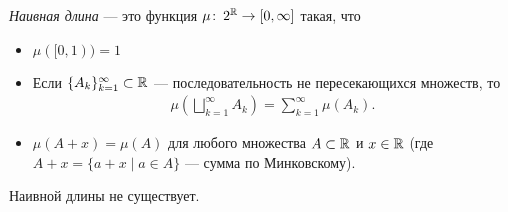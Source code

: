 \documentclass[../measure-theory.tex]{subfiles}
\begin{document}
\begin{df}
 \textit{Наивная длина} --- это функция $ \mu \colon\, 2^\mathbb{R} \to [0,\infty] $ такая, что
 \begin{itemize}
  \item $ \mu ([0, 1)) = 1 $
  \item Если $\{A_{k}\}_{k=1}^{\infty} \subset \mathbb{R} $  --- последовательность не пересекающихся множеств, то
   \begin{align*}
    \mu \left( \bigsqcup_{k=1}^{\infty} A_k \right) = \sum_{k=1}^{\infty} \mu(A_k)
   .\end{align*} 
  \item $ \mu(A + x) = \mu(A) $ для любого множества $ A \subset \mathbb{R} $ и $ x \in \mathbb{R} $ (где $ A + x = \{ a + x \mid a \in A \} $ --- сумма по Минковскому).
 \end{itemize}
\end{df}
\begin{thm}
 Наивной длины не существует.
\end{thm}
\end{document}
